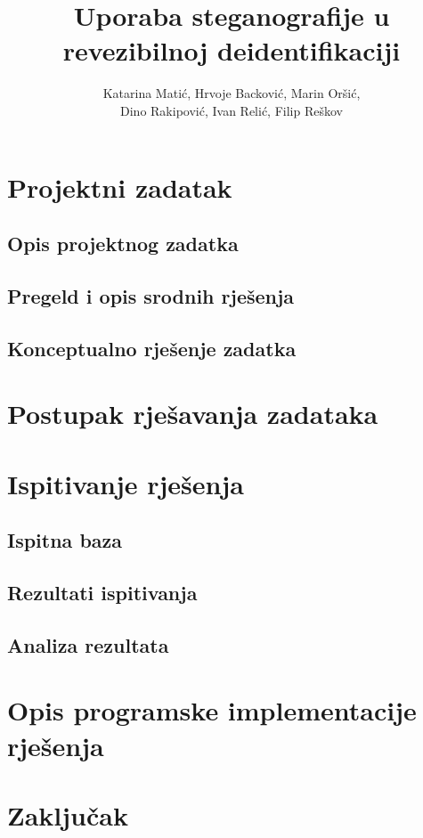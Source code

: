 \documentclass[times, utf8, seminar]{fer}
\begin{document}
\title{Uporaba steganografije u revezibilnoj deidentifikaciji}

\author{	Katarina Matić,
	Hrvoje Backović,
	Marin Oršić,\\
	Dino Rakipović,
	Ivan Relić,
	Filip Reškov	}



\maketitle

\tableofcontents

\chapter{Projektni zadatak}
\section{Opis projektnog zadatka}
\section{Pregeld i opis srodnih rješenja}
\section{Konceptualno rješenje zadatka}

\chapter{Postupak rješavanja zadataka}

\chapter{Ispitivanje rješenja}
\section{Ispitna baza}
\section{Rezultati ispitivanja}
\section{Analiza rezultata}

\chapter{Opis programske implementacije rješenja}

\chapter{Zaključak}



\end{document}
